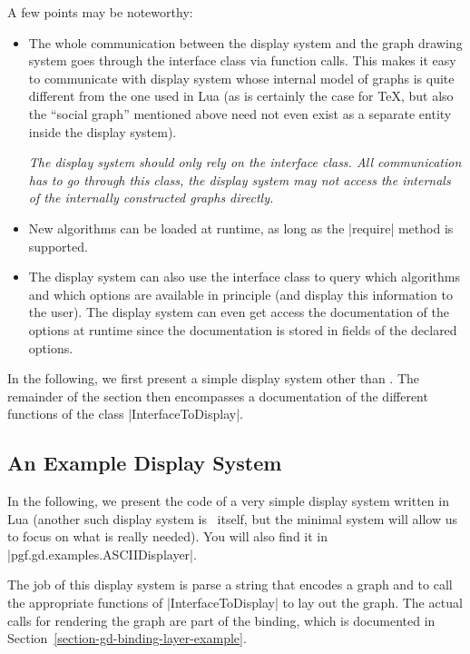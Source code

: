 A few points may be noteworthy:
\begin{itemize}
\item The whole communication between the display system and the graph
  drawing system goes through the interface class via function
  calls. This makes it easy to communicate with display system whose
  internal model of graphs is quite different from the one used in Lua
  (as is certainly the case for \TeX, but also the ``social graph''
  mentioned above need not even exist as a separate entity inside the
  display system).
  
  \emph{The display system should only rely on the interface
    class. All communication has to go through this class, the
    display system may not access the internals of the internally
    constructed graphs directly.}
\item New algorithms can be loaded at runtime, as long as the
  |require| method is supported.
\item The display system can also use the interface class to query which
  algorithms and which options are available in principle (and display
  this information to the user). The display system can even get access the
  documentation of the options at runtime since the documentation is
  stored in fields of the declared options.
\end{itemize}


In the following, we first present a simple display system other than
\tikzname. The remainder of the section then encompasses a
documentation of the different functions of the class
|InterfaceToDisplay|. 



\subsection{An Example Display System}

In the following, we present the code of a very simple display system
written in Lua (another such display system is \tikzname\ itself, but
the minimal system will allow us to focus on what is really
needed). You will also find it in |pgf.gd.examples.ASCIIDisplayer|. 

The job of this display system is parse a string that encodes a graph
and to call the appropriate functions of |InterfaceToDisplay| to lay
out the graph. The actual calls for rendering the graph are part of
the binding, which is documented in
Section~\ref{section-gd-binding-layer-example}.

